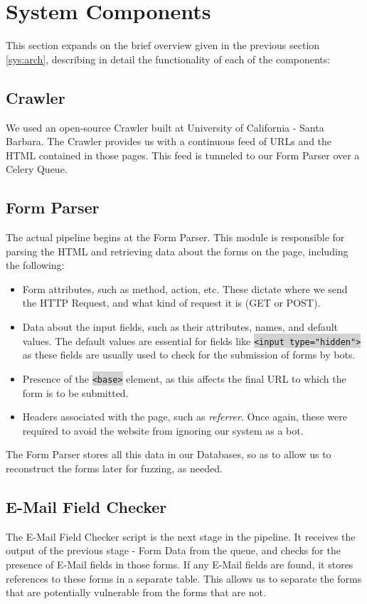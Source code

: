 \section{System Components}
\label{Comp}

This section expands on the brief overview given in the previous section \ref{sys:arch}, describing in detail the functionality of each of the components:

\subsection{Crawler}
	\label{Comp:Crawler}
	We used an open-source Crawler built at University of California - Santa Barbara. The Crawler provides us with a continuous feed of URLs and the HTML contained in those pages. This feed is tunneled to our Form Parser over a Celery Queue.
	
\subsection{Form Parser}
	\label{Comp:FP}
	The actual pipeline begins at the Form Parser. This module is responsible for parsing the HTML and retrieving data about the forms on the page, including the following:
	\begin{itemize}
		\item Form attributes, such as method, action, etc. These dictate where we send the HTTP Request, and what kind of request it is (GET or POST).
		\item Data about the input fields, such as their attributes, names, and default values. The default values are essential for fields like \colorbox{lightgray}{\lstinline{<input type="hidden">}} as these fields are usually used to check for the submission of forms by bots.
		\item Presence of the \colorbox{lightgray}{\lstinline{<base>}} element, as this affects the final URL to which the form is to be submitted.
		\item Headers associated with the page, such as \emph{referrer}. Once again, these were required to avoid the website from ignoring our system as a bot.
	\end{itemize} 
	The Form Parser stores all this data in our Databases, so as to allow us to reconstruct the forms later for fuzzing, as needed.

\subsection{E-Mail Field Checker}
	\label{Comp:EMFC}
	The E-Mail Field  Checker script is the next stage in the pipeline. It receives the output of the previous stage - Form Data from the queue, and checks for the presence of E-Mail fields in those forms. If any E-Mail fields are found, it stores references to these forms in a separate table. This allows us to separate the forms that are potentially vulnerable from the forms that are not.

